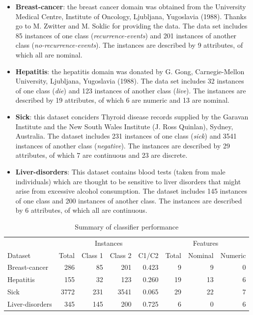 \begin{itemize}
\item \textbf{Breast-cancer}: the breast cancer domain was obtained from the University Medical Centre, Institute of Oncology, Ljubljana, Yugoslavia (1988). Thanks go to M. Zwitter and M. Soklic for providing the data. The data set includes 85 instances of one class (\textit{recurrence-events}) and 201 instances of another class (\textit{no-recurrence-events}). The instances are described by 9 attributes, of which all are nominal. 

\item \textbf{Hepatitis}: the hepatitis domain was donated by G. Gong, Carnegie-Mellon University, Ljubljana, Yugoslavia (1988). The data set includes 32 instances of one class (\textit{die}) and 123 instances of another class (\textit{live}). The instances are described by 19 attributes, of which 6 are numeric and 13 are nominal.

\item \textbf{Sick}: this dataset conciders Thyroid disease records supplied by the Garavan Institute and the New South Wales Institute (J. Ross Quinlan), Sydney, Australia. The dataset includes 231 instances of one class (\textit{sick}) and 3541 instances of another class (\textit{negative}). The instances are described by 29 attributes, of which  7 are continuous and 23 are discrete.

\item \textbf{Liver-disorders}: This dataset contains blood tests (taken from male individuals) which are thought to be sensitive to liver disorders that might arise from excessive alcohol consumption. The dataset includes 145 instances of one class and 200 instances of another class. The instances are described by 6 attributes, of which all are continuous.
\end{itemize}

\begin{table}[h]
\centering  
\begin{tabular}{ l | r r r r | r r r|}       
& \multicolumn{4}{c}{Instances} & \multicolumn{3}{c}{Features}\\                               
Dataset & Total & Class 1 & Class 2 & C1/C2 & Total & Nominal & Numeric\\
\hline
Breast-cancer & 286 & 85 & 201 & 0.423 & 9 & 9 & 0\\
Hepatitis & 155 & 32 & 123  & 0.260 & 19 & 13 & 6\\
Sick & 3772 & 231 & 3541 & 0.065 & 29 & 22 & 7\\
Liver-disorders & 345 & 145 & 200 & 0.725 & 6 & 0 & 6\\
\hline

\end{tabular}
\label{tab:PPer}
\caption{Summary of classifier performance} %
\end{table}


